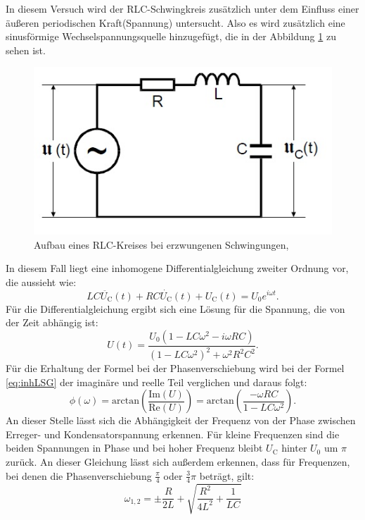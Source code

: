 In diesem Versuch wird der RLC-Schwingkreis zusätzlich unter dem Einfluss einer äußeren periodischen Kraft(Spannung) untersucht. Also es wird zusätzlich eine sinusförmige Wechselspannungsquelle hinzugefügt, 
die in der Abbildung \ref{fig:rlcw} zu sehen ist. 
\begin{figure}[h!]
	\centering
	\includegraphics[width=0.5\linewidth]{RLCW.jpg}
	\caption{Aufbau eines RLC-Kreises bei erzwungenen Schwingungen,\cite[6]{anleitung354}}
	\label{fig:rlcw}
\end{figure}
In diesem Fall liegt eine inhomogene Differentialgleichung zweiter Ordnung vor, die aussieht wie:
\begin{equation}
\label{eq:inhDGL}
LC\ddot{U_\text{C}}(t) + RC\dot{U_\text{C}}(t) + U_\text{C}(t) = U_\text{0}e^{i\omega t}.
\end{equation}
Für die Differentialgleichung ergibt sich eine Lösung für die Spannung, die von der Zeit abhängig ist:
\begin{equation}
\label{eq:inhLSG}
U(t) = \frac{U_{0}(1-LC\omega^{2}-i\omega RC)}{(1-LC\omega^{2})^{2}+\omega^{2}R^{2}C^{2}}.
\end{equation}
Für die Erhaltung der Formel bei der Phasenverschiebung wird bei der Formel \ref{eq:inhLSG} der imaginäre und reelle Teil verglichen und daraus folgt:
\begin{equation}
\phi(\omega) = \text{arctan}\left(\frac{\text{Im}(U)}{\text{Re}(U)}\right) = \text{arctan}\left(\frac{-\omega RC}{1-LC\omega^{2}}\right).
\end{equation}
An dieser Stelle lässt sich die Abhängigkeit der Frequenz von der Phase zwischen Erreger- und Kondensatorspannung erkennen. Für kleine Frequenzen sind die beiden Spannungen in Phase und bei hoher 
Frequenz bleibt $U_\text{C}$ hinter $U_{0}$ um $\pi$ zurück.
An dieser Gleichung lässt sich außerdem erkennen, dass für Frequenzen, bei denen die Phasenverschiebung $\frac{\pi}{4}$ oder $\frac{3}{4}\pi$ beträgt, gilt:
\begin{equation}
\omega_{1,2} = \pm \frac{R}{2L} + \sqrt{\frac{R^{2}}{4L^{2}}+\frac{1}{LC}}
\label{eq:frequenzen12}
\end{equation}
